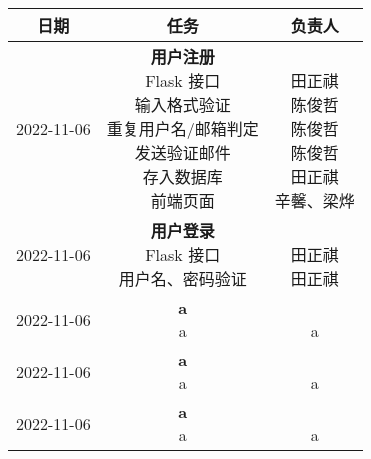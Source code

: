 \begin{table}[h!]
    \centering
    \begin{tabular}{ccc}\toprule
        \textbf{日期} & \textbf{任务} & \textbf{负责人} \\\midrule
        2022-11-06 & \makecell[l]{\textbf{用户注册} \\
            Flask 接口 \\
            输入格式验证 \\
            重复用户名/邮箱判定 \\
            发送验证邮件 \\
            存入数据库 \\
            前端页面
        } & \makecell{ \\
            田正祺 \\
            陈俊哲 \\
            陈俊哲 \\
            陈俊哲 \\
            田正祺 \\
            辛馨、梁烨
        } \\\midrule
        2022-11-06 & \makecell[l]{\textbf{用户登录} \\
            Flask 接口 \\
            用户名、密码验证 \\
        } & \makecell{ \\
            田正祺 \\
            田正祺 \\
        } \\\midrule
        2022-11-06 & \makecell[l]{\textbf{a} \\
            a
        } & \makecell{ \\
            a
        } \\\midrule
        2022-11-06 & \makecell[l]{\textbf{a} \\
            a
        } & \makecell{ \\
            a
        } \\\midrule
        2022-11-06 & \makecell[l]{\textbf{a} \\
            a
        } & \makecell{ \\
            a
        } \\\midrule
        \bottomrule
    \end{tabular}
\end{table}